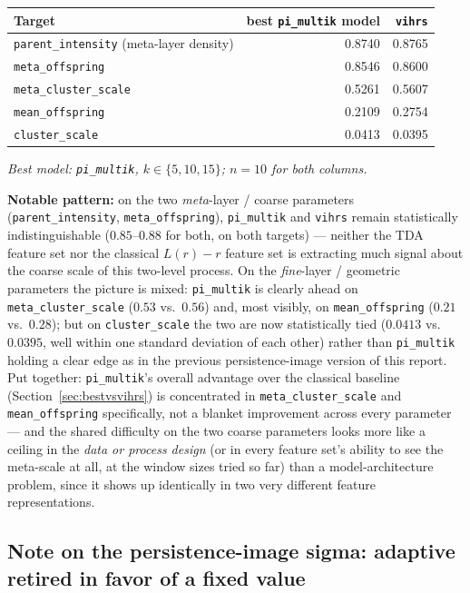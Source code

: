 \documentclass[11pt]{article}
\begin{document}
\begin{center}
\begin{tabular}{@{}lrr@{}}
\toprule
\textbf{Target} & \textbf{best \texttt{pi\_multik} model} & \texttt{vihrs} \\
\midrule
\texttt{parent\_intensity} (meta-layer density) & 0.8740 & 0.8765 \\
\texttt{meta\_offspring}      & 0.8546 & 0.8600 \\
\texttt{meta\_cluster\_scale} & 0.5261 & 0.5607 \\
\texttt{mean\_offspring}      & 0.2109 & 0.2754 \\
\texttt{cluster\_scale}       & 0.0413 & 0.0395 \\
\bottomrule
\end{tabular}
\end{center}
\emph{Best model: \texttt{pi\_multik}, $k\in\{5,10,15\}$; $n=10$ for both
columns.}

\textbf{Notable pattern:} on the two \emph{meta}-layer / coarse parameters
(\texttt{parent\_intensity}, \texttt{meta\_offspring}), \texttt{pi\_multik} and
\texttt{vihrs} remain statistically indistinguishable ($0.85$--$0.88$ for both,
on both targets) — neither the TDA feature set nor the classical $L(r)-r$
feature set is extracting much signal about the coarse scale of this
two-level process. On the \emph{fine}-layer / geometric parameters the
picture is mixed: \texttt{pi\_multik} is clearly ahead on
\texttt{meta\_cluster\_scale} ($0.53$ vs.\ $0.56$) and, most visibly, on
\texttt{mean\_offspring} ($0.21$ vs.\ $0.28$); but on \texttt{cluster\_scale}
the two are now statistically tied ($0.0413$ vs.\ $0.0395$, well within one
standard deviation of each other) rather than \texttt{pi\_multik} holding a
clear edge as in the previous persistence-image version of this report. Put
together: \texttt{pi\_multik}'s overall advantage over the classical baseline
(Section~\ref{sec:bestvsvihrs}) is concentrated in
\texttt{meta\_cluster\_scale} and \texttt{mean\_offspring} specifically, not a
blanket improvement across every parameter — and the shared difficulty on the
two coarse parameters looks more like a ceiling in the \emph{data or process
design} (or in every feature set's ability to see the meta-scale at all, at
the window sizes tried so far) than a model-architecture problem, since it
shows up identically in two very different feature representations.

\subsection{Note on the persistence-image sigma: adaptive retired in favor of a fixed value}
\label{sec:sigma}
\end{document}

